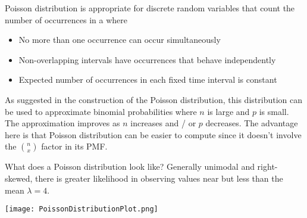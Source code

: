 Poisson distribution is appropriate for discrete random variables that count the number of occurrences in a  where

\begin{itemize}
    \item No more than one occurrence can occur simultaneously 
    \item Non-overlapping intervals have occurrences that behave independently 
    \item Expected number of occurrences in each fixed time interval is constant
\end{itemize}

As suggested in the construction of the Poisson distribution, this distribution can be used to approximate binomial probabilities where $n$ is large and $p$ is small. The approximation improves as $n$ increases and / or $p$ decreases. The advantage here is that Poisson distribution can be easier to compute since it doesn't involve the $\binom{n}{x}$ factor in its PMF. 

What does a Poisson distribution look like? Generally unimodal and right-skewed, there is greater likelihood in observing values near but less than the mean $\lambda = 4$.

\begin{center} \texttt{[image: PoissonDistributionPlot.png]} \end{center}

